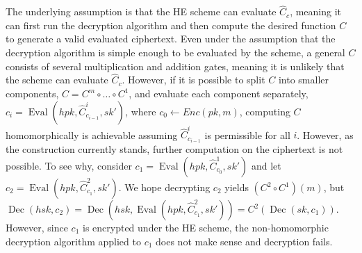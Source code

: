 The underlying assumption is that the HE scheme can evaluate $\hat{C}_c$, meaning it can first run the decryption algorithm and then compute the desired function $C$ to generate a valid evaluated ciphertext. Even under the assumption that the decryption algorithm is simple enough to be evaluated by the scheme, a general $C$ consists of several multiplication and addition gates, meaning it is unlikely that the scheme can evaluate $\hat{C}_c$. However, if it is possible to split $C$ into smaller components, $C = C^m \circ \dots \circ C^1$, and evaluate each component separately, $c_i = \operatorname{Eval}(hpk,\hat{C}^i_{c_{i-1}}, sk')$, where $c_0 \leftarrow Enc(pk,m)$, computing $C$ homomorphically is achievable assuming $\hat{C}^i_{c_{i-1}}$ is permissible for all $i$. However, as the construction currently stands, further computation on the ciphertext is not possible. To see why, consider $c_1 = \operatorname{Eval}(hpk,\hat{C}^1_{c_0}, sk')$ and let $c_2 = \operatorname{Eval}(hpk,\hat{C}^2_{c_1}, sk')$. We hope decrypting $c_2$ yields $(C^2 \circ C^1)(m)$, but $\operatorname{Dec}(hsk,c_2) = \operatorname{Dec}(hsk,\operatorname{Eval}(hpk,\hat{C}^2_{c_1}, sk')) = C^2(\operatorname{Dec}(sk, c_1))$. However, since $c_1$ is encrypted under the HE scheme, the non-homomorphic decryption algorithm applied to $c_1$ does not make sense and decryption fails.

